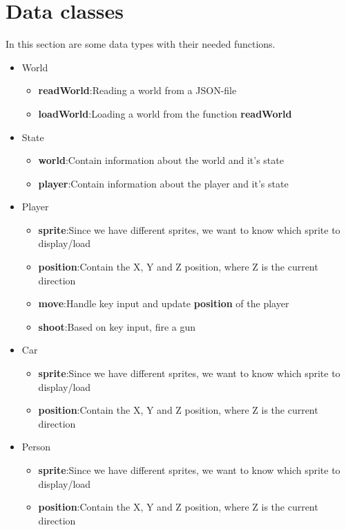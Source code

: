 \documentclass[12pt]{article}
\begin{document}
	\section{Data classes}
	In this section are some data types with their needed functions.
	\begin{itemize}
		\item World
			\begin{itemize}				
				\item \textbf{readWorld}:\quad Reading a world from a JSON-file
				\item \textbf{loadWorld}:\quad Loading a world from the function \textbf{readWorld}
			\end{itemize}
		\item State
			\begin{itemize}				
				\item \textbf{world}:\quad Contain information about the world and it's state
				\item \textbf{player}:\quad Contain information about the player and it's state
			\end{itemize}
		\item Player
			\begin{itemize}				
				\item \textbf{sprite}:\quad Since we have different sprites, we want to know which sprite to display/load
				\item \textbf{position}:\quad Contain the X, Y and Z position, where Z is the current direction
				\item \textbf{move}:\quad Handle key input and update \textbf{position} of the player
				\item \textbf{shoot}:\quad Based on key input, fire a gun
			\end{itemize}
		\item Car
			\begin{itemize}				
				\item \textbf{sprite}:\quad Since we have different sprites, we want to know which sprite to display/load
				\item \textbf{position}:\quad Contain the X, Y and Z position, where Z is the current direction
			\end{itemize}
		\item Person
			\begin{itemize}				
				\item \textbf{sprite}:\quad Since we have different sprites, we want to know which sprite to display/load
				\item \textbf{position}:\quad Contain the X, Y and Z position, where Z is the current direction

\end{itemize}
\end{itemize}
\end{document}
